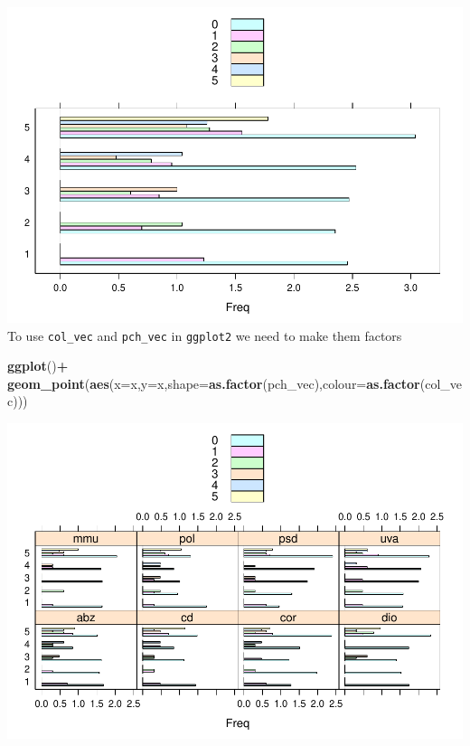 \documentclass[11pt,]{article}
\newenvironment{Shaded}{\begin{snugshade}}{\end{snugshade}}
\newcommand{\KeywordTok}[1]{\textcolor[rgb]{0.13,0.29,0.53}{\textbf{#1}}}
\newcommand{\DataTypeTok}[1]{\textcolor[rgb]{0.13,0.29,0.53}{#1}}
\newcommand{\StringTok}[1]{\textcolor[rgb]{0.31,0.60,0.02}{#1}}
\newcommand{\OperatorTok}[1]{\textcolor[rgb]{0.81,0.36,0.00}{\textbf{#1}}}
\newcommand{\NormalTok}[1]{#1}
\begin{document}
\includegraphics{Lab_2_modified_files/figure-latex/unnamed-chunk-43-1.pdf}
To use \texttt{col\_vec} and \texttt{pch\_vec} in \texttt{ggplot2} we
need to make them factors

\begin{Shaded}
\begin{Highlighting}[]
 \KeywordTok{ggplot}\NormalTok{()}\OperatorTok{+}
\StringTok{   }\KeywordTok{geom_point}\NormalTok{(}\KeywordTok{aes}\NormalTok{(}\DataTypeTok{x=}\NormalTok{x,}\DataTypeTok{y=}\NormalTok{x,}\DataTypeTok{shape=}\KeywordTok{as.factor}\NormalTok{(pch_vec),}\DataTypeTok{colour=}\KeywordTok{as.factor}\NormalTok{(col_vec)))}
\end{Highlighting}
\end{Shaded}

\includegraphics{Lab_2_modified_files/figure-latex/unnamed-chunk-44-1.pdf}
\end{document}
